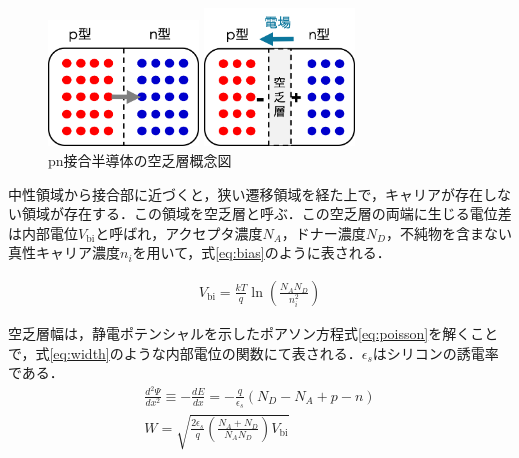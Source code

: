 \begin{figure}[h]
  \centering
  \begin{minipage}[b]{0.45\linewidth}
    \centering
    \includegraphics[width=4cm]{./figure/semiku1.png}
  \end{minipage}
  \begin{minipage}[b]{0.45\linewidth}
    \centering
    \includegraphics[width=4cm]{./figure/semiku2.png}
  \end{minipage}
  \caption{pn接合半導体の空乏層概念図}
  \label{fig:pn}
\end{figure}


中性領域から接合部に近づくと，狭い遷移領域を経た上で，キャリアが存在しない領域が存在する．この領域を空乏層と呼ぶ．この空乏層の両端に生じる電位差は内部電位$V_{\mathrm{bi}}$と呼ばれ，アクセプタ濃度$N_A$，ドナー濃度$N_D$，不純物を含まない真性キャリア濃度$n_i$を用いて，式\ref{eq:bias}のように表される．\par
\begin{eqnarray}
  \label{eq:bias}
  V_{\mathrm{bi}} = \frac{kT}{q} \ln \left( \frac{N_A N_D}{n_i^2} \right) 
\end{eqnarray}

空乏層幅は，静電ポテンシャルを示したポアソン方程式\ref{eq:poisson}を解くことで，式\ref{eq:width}のような内部電位の関数にて表される．$\epsilon_s$はシリコンの誘電率である．
\begin{eqnarray}
  \label{eq:poisson}
  \frac{d^2\Psi}{dx^2} \equiv -\frac{dE}{dx} = - \frac{q}{\epsilon_s}(N_D - N_A + p - n) \\
  \label{eq:width}
  W = \sqrt{ \frac{2\epsilon_s}{q} \left( \frac{N_A+N_D}{N_A N_D} \right) V_{\mathrm{bi}}}
\end{eqnarray}

